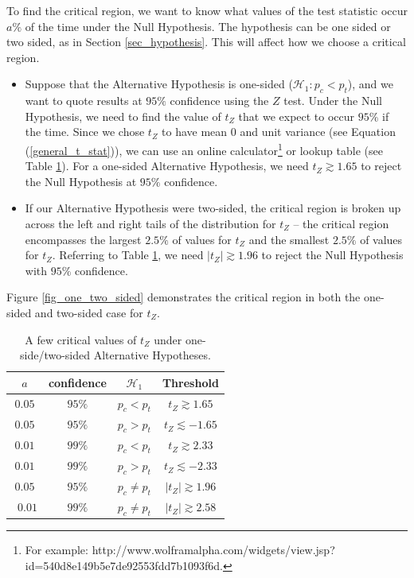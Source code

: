 \documentclass{article}
\numberwithin{equation}{section}
\begin{document}
To find the critical region, we want to know what values of the test statistic occur $a\%$ of the time under the Null Hypothesis. The hypothesis can be one sided or two sided, as in Section \ref{sec_hypothesis}. This will affect how we choose a critical region. 
\begin{itemize}
	\item Suppose that the Alternative Hypothesis is one-sided ($\mathcal{H}_1 : p_c < p_t$), and we want to quote results at $95\%$ confidence using the $Z$ test. Under the Null Hypothesis, we need to find the value of $t_Z$ that we expect to occur $95\%$ if the time. Since we chose $t_Z$ to have mean 0 and unit variance (see Equation (\ref{general_t_stat})), we can use an online calculator\footnote{For example: http://www.wolframalpha.com/widgets/view.jsp?id=540d8e149b5e7de92553fdd7b1093f6d.} or lookup table (see Table \ref{tab_threshold}). For a one-sided Alternative Hypothesis, we need $t_Z \gtrsim 1.65$ to reject the Null Hypothesis at $95\%$ confidence.
	\item If our Alternative Hypothesis were two-sided, the critical region is broken up across the left and right tails of the distribution for $t_Z$ -- the critical region encompasses the largest $2.5\%$ of values for $t_Z$ and the smallest $2.5\%$ of values for $t_Z$. Referring to Table \ref{tab_threshold}, we need $\left| t_Z \right| \gtrsim 1.96$ to reject the Null Hypothesis with $95\%$ confidence.
\end{itemize}
Figure \ref{fig_one_two_sided} demonstrates the critical region in both the one-sided and two-sided case for $t_Z$.

\begin{table}
	\begin{tabular}{c|ccc}
		$a$ & confidence & $\mathcal{H}_1$ & Threshold \\
		\hline
		\hline
		$0.05$ & $95\%$ & $p_c < p_t$ & $t_Z \gtrsim 1.65$ \\
		$0.05$ & $95\%$ & $p_c > p_t$ & $t_Z \lesssim -1.65$ \\
		$0.01$ & $99\%$ & $p_c < p_t$ & $t_Z \gtrsim 2.33$ \\
		$0.01$ & $99\%$ & $p_c > p_t$ & $t_Z \lesssim -2.33$ \\
		\hline
		$0.05$ & $95\%$ & $p_c \neq p_t$ & $\left|t_Z \right| \gtrsim 1.96$ \\\
		$0.01$ & $99\%$ & $p_c \neq p_t$ & $\left|t_Z \right| \gtrsim 2.58$ \\
		\hline	
	\end{tabular}
	\centering
	\captionsetup{width=0.6\textwidth}
	\caption{\label{tab_threshold}  A few critical values of $t_Z$ under one-side/two-sided Alternative Hypotheses.}
\end{table}
\end{document}
